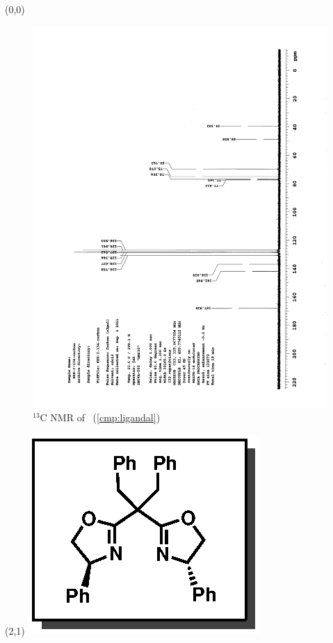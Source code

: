 \clearpage
\begin{textblock}{20}(0,0)
\begin{figure}[htb]
\caption{$^{13}$C NMR of  \CMPligandal\ (\ref{cmp:ligandal})}
\includegraphics[scale=0.75, trim = 0mm 0mm 0mm 5mm,
clip]{chp_asymmetric/images/nmr/ligandalC}
\vspace{-100pt}
\end{figure}
\end{textblock}
\begin{textblock}{1}(2,1)
\includegraphics[scale=0.8, angle=90]{chp_asymmetric/images/ligandal}
\end{textblock}
\clearpage

